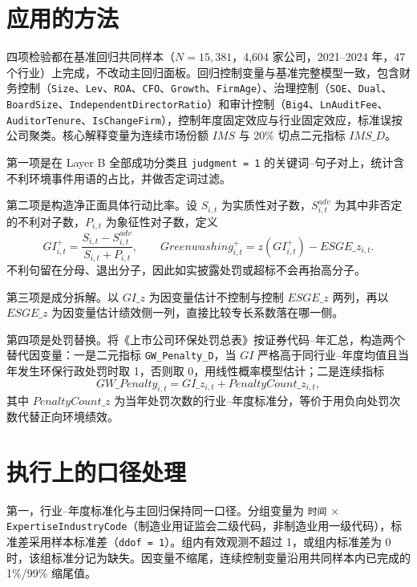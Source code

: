\documentclass[12pt,a4paper]{article}
\begin{document}
\section{应用的方法}

四项检验都在基准回归共同样本（$N=15{,}381$，4,604 家公司，2021--2024 年，47 个行业）上完成，不改动主回归面板。回归控制变量与基准完整模型一致，包含财务控制（\texttt{Size}、\texttt{Lev}、\texttt{ROA}、\texttt{CFO}、\texttt{Growth}、\texttt{FirmAge}）、治理控制（\texttt{SOE}、\texttt{Dual}、\texttt{BoardSize}、\texttt{IndependentDirectorRatio}）和审计控制（\texttt{Big4}、\texttt{LnAuditFee}、\texttt{AuditorTenure}、\texttt{IsChangeFirm}），控制年度固定效应与行业固定效应，标准误按公司聚类。核心解释变量为连续市场份额 $IMS$ 与 20\% 切点二元指标 $IMS\_D$。

第一项是在 Layer B 全部成功分类且 \texttt{judgment = 1} 的关键词--句子对上，统计含不利环境事件用语的占比，并做否定词过滤。

第二项是构造净正面具体行动比率。设 $S_{i,t}$ 为实质性对子数，$S^{adv}_{i,t}$ 为其中非否定的不利对子数，$P_{i,t}$ 为象征性对子数，定义
\begin{equation}
GI^+_{i,t}=\frac{S_{i,t}-S^{adv}_{i,t}}{S_{i,t}+P_{i,t}},
\qquad
Greenwashing^+_{i,t}=z(GI^+_{i,t})-ESGE\_z_{i,t}.
\end{equation}
不利句留在分母、退出分子，因此如实披露处罚或超标不会再抬高分子。

第三项是成分拆解。以 $GI\_z$ 为因变量估计不控制与控制 $ESGE\_z$ 两列，再以 $ESGE\_z$ 为因变量估计绩效侧一列，直接比较专长系数落在哪一侧。

第四项是处罚替换。将《上市公司环保处罚总表》按证券代码--年汇总，构造两个替代因变量：一是二元指标 \texttt{GW\_Penalty\_D}，当 $GI$ 严格高于同行业--年度均值且当年发生环保行政处罚时取 1，否则取 0，用线性概率模型估计；二是连续指标
\begin{equation}
GW\_Penalty_{i,t}=GI\_z_{i,t}+PenaltyCount\_z_{i,t},
\end{equation}
其中 $PenaltyCount\_z$ 为当年处罚次数的行业--年度标准分，等价于用负向处罚次数代替正向环境绩效。

\section{执行上的口径处理}

第一，行业--年度标准化与主回归保持同一口径。分组变量为 \texttt{时间} $\times$ \texttt{ExpertiseIndustryCode}（制造业用证监会二级代码，非制造业用一级代码），标准差采用样本标准差（\texttt{ddof = 1}）。组内有效观测不超过 1，或组内标准差为 0 时，该组标准分记为缺失。因变量不缩尾，连续控制变量沿用共同样本内已完成的 1\%/99\% 缩尾值。
\end{document}
